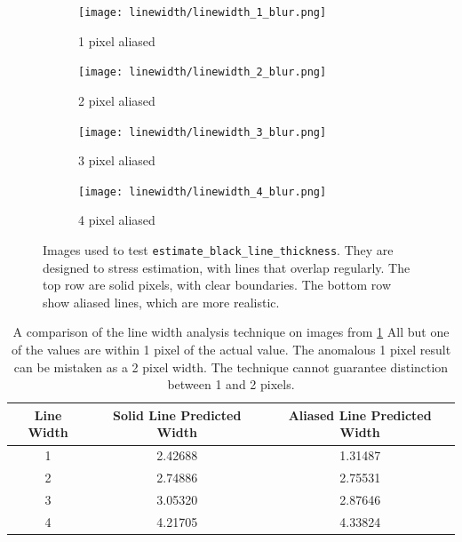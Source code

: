 \documentclass[../main.tex]{subfiles}
\begin{document}
\begin{figure}[H]
      \begin{subfigure}[B]{0.19\textwidth}
        \centering
        \texttt{[image: linewidth/linewidth\_1\_blur.png]}
        \caption{1 pixel aliased}
      \end{subfigure}
      \begin{subfigure}[B]{0.19\textwidth}
        \centering
        \texttt{[image: linewidth/linewidth\_2\_blur.png]}
        \caption{2 pixel aliased}
      \end{subfigure}
       \begin{subfigure}[B]{0.19\textwidth}
        \centering
        \texttt{[image: linewidth/linewidth\_3\_blur.png]}
        \caption{3 pixel aliased}
      \end{subfigure}
     \begin{subfigure}[B]{0.19\textwidth}
        \centering
        \texttt{[image: linewidth/linewidth\_4\_blur.png]}
        \caption{4 pixel aliased}
      \end{subfigure}
      \caption[
          Test images for \texttt{estimate\_black\_line\_thickness}
        ]{
        Images used to test \texttt{estimate\_black\_line\_thickness}.
        They are designed to stress estimation, with lines that overlap regularly.
        The top row are solid pixels, with clear boundaries.
        The bottom row show aliased lines, which are more realistic.
      }
      \label{solid_linewidth}

    \end{figure}
    \begin{table}[H]
      \centering
      \begin{tabular}{|c|c|c|}
        \hline
        Line Width&Solid Line Predicted Width&Aliased Line Predicted Width\\
        \hline
        1&2.42688&1.31487\\
        \hline
        2&2.74886&2.75531\\
        \hline
        3&3.05320&2.87646\\
        \hline
        4&4.21705&4.33824\\
        \hline
      \end{tabular}
      \caption[
        Table of estimated line widths of test images
      ]{
        A comparison of the line width analysis technique on images from \ref{solid_linewidth}
        All but one of the values are within 1 pixel of the actual value.
        The anomalous 1 pixel result can be mistaken as a 2 pixel width.
        The technique cannot guarantee distinction between 1 and 2 pixels.
      }
      \label{linewidthtable}
  \end{table}
\end{document}
